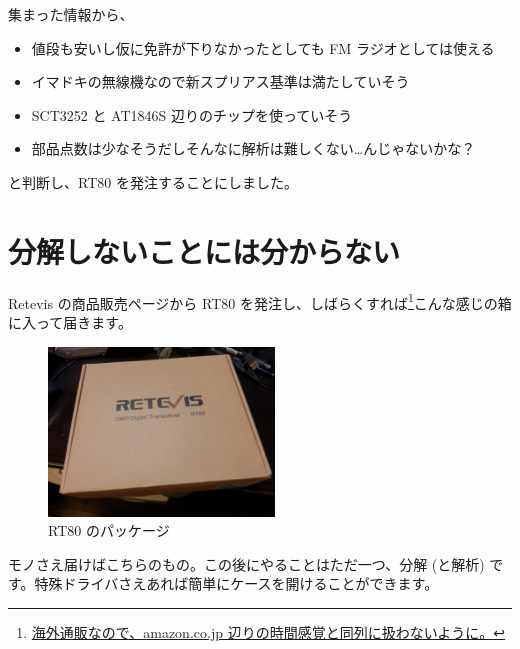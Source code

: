 \documentclass[a4j,oneside]{ujbook}
\begin{document}
集まった情報から、
\begin{itemize}
 \item 値段も安いし仮に免許が下りなかったとしても FM ラジオとしては使える
 \item イマドキの無線機なので新スプリアス基準は満たしていそう
 \item SCT3252 と AT1846S 辺りのチップを使っていそう
 \item 部品点数は少なそうだしそんなに解析は難しくない…んじゃないかな？
\end{itemize}
と判断し、RT80 を発注することにしました。

\section{分解しないことには分からない}

Retevis の商品販売ページから RT80 を発注し、しばらくすれば\footnote{\url{海外通販なので、amazon.co.jp 辺りの時間感覚と同列に扱わないように。}}こんな感じの箱に入って届きます。

\begin{figure}[H]
 \centering
 \includegraphics[width=6cm]{img/pa133669.jpg}
 \caption{RT80 のパッケージ}
\end{figure}

モノさえ届けばこちらのもの。この後にやることはただ一つ、分解 (と解析) です。特殊ドライバさえあれば簡単にケースを開けることができます。
\end{document}
